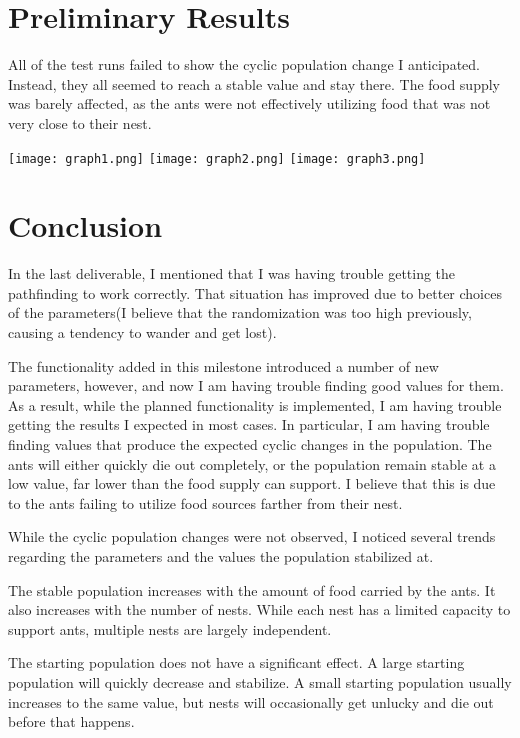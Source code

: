\documentclass{article}
\begin{document}
\section{Preliminary Results}

All of the test runs failed to show the cyclic population change I anticipated.  Instead, they all seemed to reach a stable value and stay there.  The food supply was barely affected, as the ants were not effectively utilizing food that was not very close to their nest.

\texttt{[image: graph1.png]}
\texttt{[image: graph2.png]}
\texttt{[image: graph3.png]}


\section{Conclusion}

In the last deliverable, I mentioned that I was having trouble getting the pathfinding to work correctly.  That situation has improved due to better choices of the parameters(I believe that the randomization was too high previously, causing a tendency to wander and get lost).

The functionality added in this milestone introduced a number of new parameters, however, and now I am having trouble finding good values for them.
As a result, while the planned functionality is implemented, I am having trouble getting the results I expected in most cases.  In particular, I am having trouble finding values that produce the expected cyclic changes in the population.  The ants will either quickly die out completely, or the population remain stable at a low value, far lower than the food supply can support.  I believe that this is due to the ants failing to utilize food sources farther from their nest.

While the cyclic population changes were not observed, I noticed several trends regarding the parameters and the values the population stabilized at.

The stable population increases with the amount of food carried by the ants.  It also increases with the number of nests.  While each nest has a limited capacity to support ants, multiple nests are largely independent.

The starting population does not have a significant effect.  A large starting population will quickly decrease and stabilize.  A small starting population usually increases to the same value, but nests will occasionally get unlucky and die out before that happens.
\end{document}
